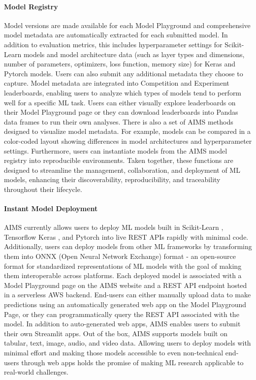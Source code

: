\paragraph{Model Registry} Model versions are made available for each Model Playground and comprehensive model metadata are automatically extracted for each submitted model. In addition to evaluation metrics, this includes hyperparameter settings for Scikit-Learn models and model architecture data (such as layer types and dimensions, number of parameters, optimizers, loss function, memory size) for Keras and Pytorch models. Users can also submit any additional metadata they choose to capture. Model metadata are integrated into Competition and Experiment leaderboards, enabling users to analyze which types of models tend to perform well for a specific ML task. Users can either visually explore leaderboards on their Model Playground page or they can download leaderboards into Pandas data frames to run their own analyses. There is also a set of AIMS methods designed to visualize model metadata. For example, models can be compared in a color-coded layout showing differences in model architectures and hyperparameter settings. Furthermore, users can instantiate models from the AIMS model registry into reproducible environments. Taken together, these functions are designed to streamline the management, collaboration, and deployment of ML models, enhancing their discoverability, reproducibility, and traceability throughout their lifecycle.

\paragraph{Instant Model Deployment} AIMS currently allows users to deploy ML models built in Scikit-Learn \citep{pedregosa_scikit-learn:_2011}, Tensorflow Keras \citep{abadi_tensorflow_2016, chollet_keras_2015}, and Pytorch \citep{paszke_pytorch_2019} into live REST APIs rapidly with minimal code. Additionally, users can deploy models from other ML frameworks by transforming them into ONNX (Open Neural Network Exchange) format - an open-source format for standardized representations of ML models with the goal of making them interoperable across platforms. Each deployed model is associated with a Model Playground page on the AIMS website and a REST API endpoint hosted in a serverless AWS backend. End-users can either manually upload data to make predictions using an automatically generated web app on the Model Playground Page, or they can programmatically query the REST API associated with the model. In addition to auto-generated web apps, AIMS enables users to submit their own Streamlit apps. Out of the box, AIMS supports models built on tabular, text, image, audio, and video data. Allowing users to deploy models with minimal effort and making those models accessible to even non-technical end-users through web apps holds the promise of making ML research applicable to real-world challenges.



